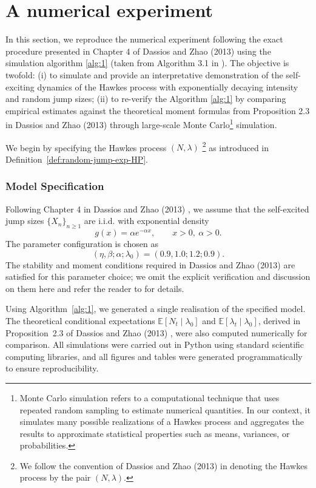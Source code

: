 \documentclass[12pt,a4paper]{report}
\theoremstyle{plain}
\theoremstyle{definition}
\theoremstyle{remark}
\newcommand{\1}{\mathbf{1}}
\begin{document}
\section{A numerical experiment}\label{sec:7.2}
In this section, we reproduce the numerical experiment following the exact procedure presented in Chapter 4 of Dassios and Zhao (2013) \cite{DZ13} using the simulation algorithm \ref{alg:1} (taken from Algorithm 3.1 in \cite{DZ13}). The objective is twofold:
(i) to simulate and provide an interpretative demonstration of the self-exciting dynamics of the Hawkes process with exponentially decaying intensity and random jump sizes;
(ii) to re-verify the Algorithm \ref{alg:1} by comparing empirical estimates against the theoretical moment formulas from Proposition 2.3 in Dassios and Zhao (2013) \cite{DZ13} through large-scale Monte Carlo\footnote{Monte Carlo simulation refers to a computational technique that uses repeated random sampling to estimate numerical quantities. In our context, it simulates many possible realizations of a Hawkes process and aggregates the results to approximate statistical properties such as means, variances, or probabilities.} simulation.

\medskip
\noindent
We begin by specifying the Hawkes process $(N,\lambda)$
\footnote{We follow the convention of Dassios and Zhao (2013) \cite{DZ13} in denoting the Hawkes process by the pair $(N,\lambda)$.}
as introduced in Definition~\ref{def:random-jump-exp-HP}.
\subsubsection*{Model Specification}
Following Chapter 4 in Dassios and Zhao (2013) \cite{DZ13}, we assume that the self-excited jump sizes $\{X_n\}_{n\ge1}$ are i.i.d. with exponential density
\[
g(x)=\alpha e^{-\alpha x}, \qquad x>0,\ \alpha>0.
\]
The parameter configuration is chosen as
\[
(\eta,\beta;\alpha;\lambda_0)=(0.9,1.0;1.2;0.9).
\]
The stability and moment conditions required in Dassios and Zhao (2013) \cite{DZ13} are satisfied for this parameter choice; we omit the explicit verification and discussion on them here and refer the reader to \cite{DZ13} for details.

\medskip
\noindent
Using Algorithm~\ref{alg:1}, we generated a single realisation of the specified model.
The theoretical conditional expectations $\mathbb{E}[N_t \mid \lambda_0]$ and
$\mathbb{E}[\lambda_t \mid \lambda_0]$, derived in Proposition~2.3 of
Dassios and Zhao (2013) \cite{DZ13}, were also computed numerically for comparison.
All simulations were carried out in Python using standard scientific computing libraries, and all figures and tables were generated programmatically to ensure reproducibility.
\end{document}
